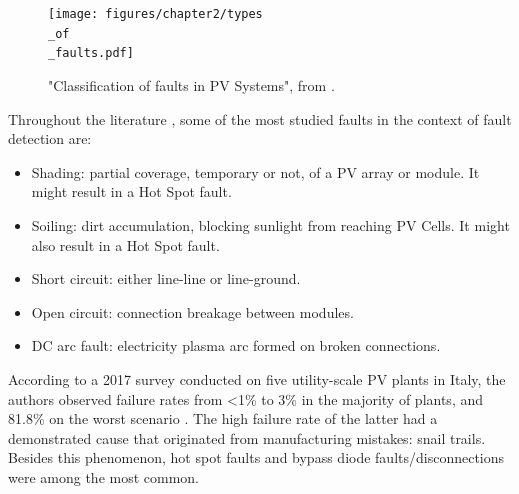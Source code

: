 \begin{figure}[h]
    \centering
    \texttt{[image: figures/chapter2/types\\\_of\\\_faults.pdf]} \caption{"Classification of
    faults in PV Systems", from \cite{Pillai2018}.}
    \label{fig:faults}
\end{figure}

Throughout the literature \cite{Braun2011}, some of the most studied faults in the context of fault detection are:

\begin{itemize}
    \item Shading: partial coverage, temporary or not, of a PV array or module. It might result in a Hot Spot fault.
    \item Soiling: dirt accumulation, blocking sunlight from reaching PV Cells. It might also result in a Hot Spot fault.
    \item Short circuit: either line-line or line-ground.
    \item Open circuit: connection breakage between modules.
    \item DC arc fault: electricity plasma arc formed on broken connections.
\end{itemize}

According to a 2017 survey conducted on five utility-scale PV plants in Italy, the authors observed failure rates from
<1\% to 3\% in the majority of plants, and 81.8\% on the worst scenario \cite{Grimaccia2017}. The high failure rate of
the latter had a demonstrated cause that originated from manufacturing mistakes: snail trails. Besides this phenomenon,
hot spot faults and bypass diode faults/disconnections were among the most common.

